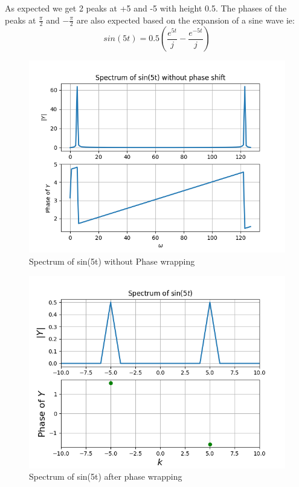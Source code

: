 \documentclass{article}
\begin{document}
As expected we get 2 peaks at +5 and -5 with height 0.5. The phases of the peaks at $\frac{\pi}{2}$ and $-\frac{\pi}{2}$ are also expected based on the expansion of a sine wave ie:
\begin{equation}
sin(5t) = 0.5(\frac{e^{5t}}{j}-\frac{e^{-5t}}{j})
\end{equation}
\begin{figure}[h!]
\centering
\includegraphics[scale=0.6]{Figure_1.png}
\caption{Spectrum of sin(5t) without Phase wrapping}
\label{fig:universe}
\end{figure}

\begin{figure}[h!]
\centering
\includegraphics[scale=0.6]{Figure_2.png}
\caption{Spectrum of sin(5t) after phase wrapping}
\label{fig:universe}
\end{figure}
\end{document}
